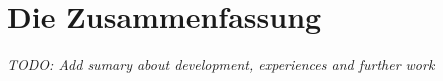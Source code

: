 \chapter{Die Zusammenfassung}
\label{cha:Zusammenfassung}
\emph{TODO: Add sumary about development, experiences and further work}
